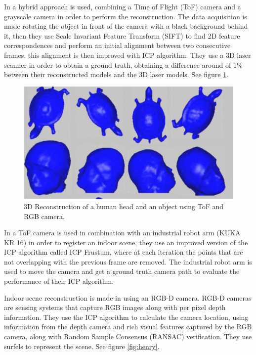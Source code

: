 In \cite{guangyu} a hybrid approach is used, combining a Time of Flight (ToF) camera and a grayscale camera in order to perform the reconstruction. 
The data acquisition is made rotating the object in front of the camera with a black background behind it, then they use 
Scale Invariant Feature Transform (SIFT) to find 2D feature correspondences and perform an initial alignment between two consecutive frames, this alignment is 
then improved with ICP algorithm. They use a 3D laser scanner in order to obtain a ground truth, obtaining a difference around of 1\% 
between their reconstructed
 models and the 3D laser models. See figure \ref{fig:guangyu}.




\begin{figure}[h!]
\begin{center}
\includegraphics[scale=0.38]{images/guangyu}
\caption{3D Reconstruction of a human head and an object using ToF and RGB camera.}
\label{fig:guangyu}
\end{center}
\end{figure}

In \cite{may2009} a ToF camera is used in combination with an industrial robot arm (KUKA KR 16) in order to register an indoor scene,
they use an improved version of the ICP algorithm called ICP Frustum, where at each iteration the points that are not overlapping with the previous frame are removed. The industrial robot arm is used to move the camera and get a ground truth camera path to evaluate the performance of their ICP algorithm. 



 Indoor scene reconstruction is made in \cite{henry} using an RGB-D camera. RGB-D cameras are sensing systems that capture RGB images
 along with per pixel depth information. They use the ICP algorithm to calculate the camera location, using information from 
the depth camera and  rich visual
 features captured by the RGB camera, along with Random Sample Consensus (RANSAC) verification. They use surfels \cite{pfister} to represent the scene. See figure \ref{fig:henry}.

